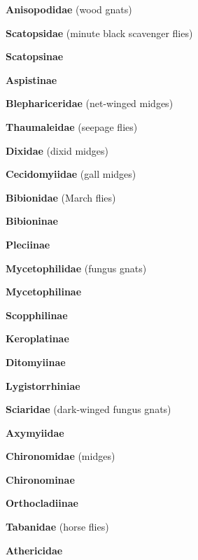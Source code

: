 \documentclass[letterpaper,10pt]{article}
\begin{document}
{\makebox[0.6cm]{}  \textbf{Anisopodidae} (wood gnats) \par
\makebox[0.6cm]{}  \textbf{Scatopsidae} (minute black scavenger flies) \par
\makebox[0.8cm]{}  \textbf{Scatopsinae} \par
\makebox[0.8cm]{}  \textbf{Aspistinae} \par
\makebox[0.6cm]{}  \textbf{Blephariceridae} (net-winged midges) \par
\makebox[0.6cm]{}  \textbf{Thaumaleidae} (seepage flies) \par
\makebox[0.6cm]{}  \textbf{Dixidae} (dixid midges) \par
\makebox[0.6cm]{}  \textbf{Cecidomyiidae} (gall midges) \par
\makebox[0.6cm]{}  \textbf{Bibionidae} (March flies) \par
\makebox[0.8cm]{}  \textbf{Bibioninae} \par
\makebox[0.8cm]{}  \textbf{Pleciinae} \par
\makebox[0.6cm]{}  \textbf{Mycetophilidae} (fungus gnats) \par
\makebox[0.8cm]{}  \textbf{Mycetophilinae} \par
\makebox[0.8cm]{}  \textbf{Scopphilinae} \par
\makebox[0.8cm]{}  \textbf{Keroplatinae} \par
\makebox[0.8cm]{}  \textbf{Ditomyiinae} \par
\makebox[0.8cm]{}  \textbf{Lygistorrhiniae} \par
\makebox[0.6cm]{}  \textbf{Sciaridae} (dark-winged fungus gnats) \par
\makebox[0.6cm]{}  \textbf{Axymyiidae} \par
\makebox[0.6cm]{}  \textbf{Chironomidae} (midges) \par
\makebox[0.8cm]{}  \textbf{Chironominae} \par
\makebox[0.8cm]{}  \textbf{Orthocladiinae} \par
\makebox[0.6cm]{}  \textbf{Tabanidae} (horse flies) \par
\makebox[0.6cm]{}  \textbf{Athericidae} \par
}
\end{document}
